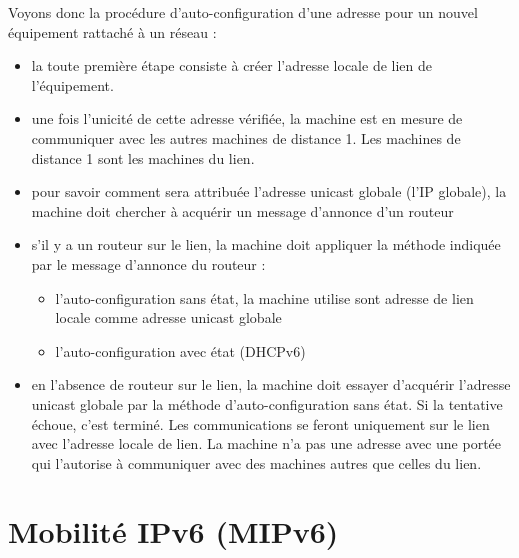 \documentclass[a4paper,11pt,final]{article}
\begin{document}
Voyons donc la procédure d’auto-configuration d’une adresse pour un nouvel équipement rattaché à un réseau :
\begin{itemize}
\item la toute première étape consiste à créer l'adresse locale de lien de l’équipement.
\item une fois l'unicité de cette adresse vérifiée, la machine est en mesure de communiquer avec les autres machines de distance 1. Les machines de distance 1 sont les machines du lien.
\item pour savoir comment sera attribuée l’adresse unicast globale (l’IP globale), la machine doit chercher à acquérir un message d'annonce d’un routeur
\item s'il y a un routeur sur le lien, la machine doit appliquer la méthode indiquée par le message d'annonce du routeur :
\begin{itemize}
\item l'auto-configuration sans état, la machine utilise sont adresse de lien locale comme adresse unicast globale
\item l'auto-configuration avec état (DHCPv6)
\end{itemize}
\item en l'absence de routeur sur le lien, la machine doit essayer d'acquérir l'adresse unicast globale par la méthode d'auto-configuration sans état. Si la tentative échoue, c'est terminé. Les communications se feront uniquement sur le lien avec l'adresse locale de lien. La machine n'a pas une adresse avec une portée qui l'autorise à communiquer avec des machines autres que celles du lien.
\end{itemize}

\section{Mobilité IPv6 (MIPv6)}
\end{document}
